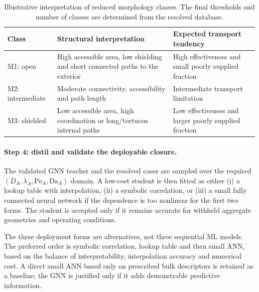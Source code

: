 \documentclass[11pt,a4paper]{article}
\newcommand{\Pe}{\mathrm{Pe}}
\newcommand{\Da}{\mathrm{Da}}
\begin{document}
\begin{table}[htbp]
\centering
\caption{Illustrative interpretation of reduced morphology classes. The final
thresholds and number of classes are determined from the resolved database.}
\label{tab:morphclasses}
\small
\begin{tabular}{>{\raggedright\arraybackslash}p{}
                >{\raggedright\arraybackslash}p{}
                >{\raggedright\arraybackslash}p{}}
\toprule
\textbf{Class} & \textbf{Structural interpretation} &
\textbf{Expected transport tendency}\\
\midrule
M1: open &
High accessible area, low shielding and short connected paths to the exterior &
High effectiveness and small poorly supplied fraction\\
M2: intermediate &
Moderate connectivity, accessibility and path length &
Intermediate transport limitation\\
M3: shielded &
Low accessible area, high coordination or long/tortuous internal paths &
Low effectiveness and larger poorly supplied fraction\\
\bottomrule
\end{tabular}
\end{table}

\paragraph{Step 4: distil and validate the deployable closure.}
The validated GNN teacher and the resolved cases are sampled over the required
\((D_A,\lambda_A,\Pe_A,\Da_A)\) domain. A low-cost student is then fitted as
either (i) a lookup table with interpolation, (ii) a symbolic correlation, or
(iii) a small fully connected neural network if the dependence is too
nonlinear for the first two forms. The student is accepted only if it remains
accurate for withheld aggregate geometries and operating conditions.

The three deployment forms are alternatives, not three sequential ML models.
The preferred order is symbolic correlation, lookup table and then small ANN,
based on the balance of interpretability, interpolation accuracy and numerical
cost. A direct small ANN based only on prescribed bulk descriptors is retained
as a baseline; the GNN is justified only if it adds demonstrable predictive
information.
\end{document}
